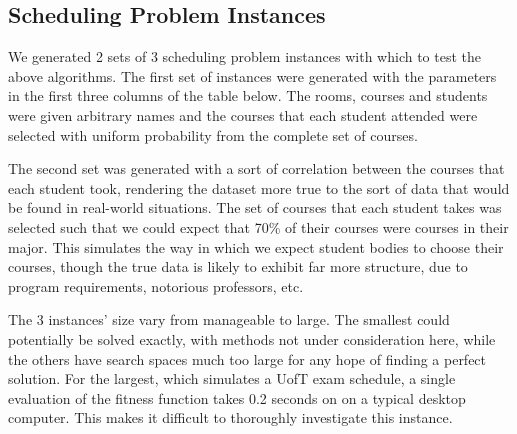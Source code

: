 \documentclass[letterpaper]{article}
\begin{document}
    \subsection{Scheduling Problem Instances}
      We generated 2 sets of 3 scheduling problem instances with which to test the 
      above algorithms. The first set of instances were generated with the parameters 
      in the first three columns of the table below. The rooms, courses and students 
      were given arbitrary names and the courses that each student attended were 
      selected with uniform probability from the complete set of courses.
      
      The second set was generated with a sort of correlation between the courses that each 
      student took, rendering the dataset more true to the sort of data that would be found 
      in real-world situations. The set of courses that each student takes was selected such 
      that we could expect that 70\% of their courses were courses in their major. This 
      simulates the way in which we expect student bodies to choose their courses, though 
      the true data is likely to exhibit far more structure, due to program requirements, 
      notorious professors, etc.
      
      The 3 instances' size vary from manageable to large. The smallest could potentially be 
      solved exactly, with methods not under consideration here, while the others have 
      search spaces much too large for any hope of finding a perfect solution. For the 
      largest, which simulates a UofT exam schedule, a single evaluation of the fitness 
      function takes 0.2 seconds on on a typical desktop computer. This makes it difficult 
      to thoroughly investigate this instance.
      
\end{document}
